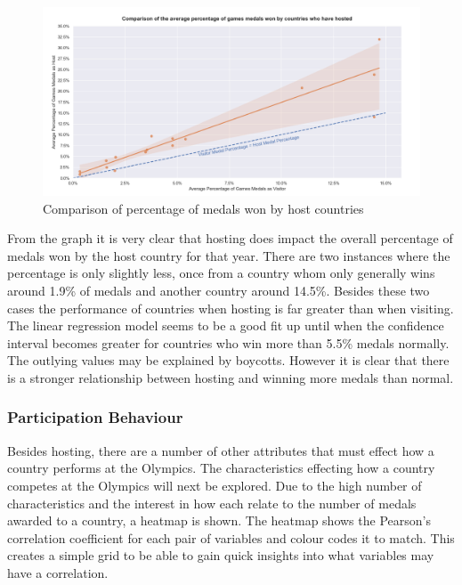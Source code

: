 \documentclass[a4 paper, 12pt]{article}
\begin{document}
        \begin{figure} [H]
            \centering
            \includegraphics[width=\textwidth, frame]
                {./images/graph/countries_host_lmplot.png}      
                \caption{Comparison of percentage of medals won by host countries} 
        \end{figure}
        From the graph it is very clear that hosting does impact the overall percentage of medals won by the host country for that year. There are two instances where the percentage is only slightly less, once from a country whom only generally wins around 1.9\% of medals and another country around 14.5\%. Besides these two cases the performance of countries when hosting is far greater than when visiting. The linear regression model seems to be a good fit up until when the confidence interval becomes greater for countries who win more than 5.5\% medals normally. The outlying values may be explained by boycotts. However it is clear that there is a stronger relationship between hosting and winning more medals than normal. 

        \subsubsection{Participation Behaviour}
        Besides hosting, there are a number of other attributes that must effect how a country performs at the Olympics. The characteristics effecting how a country competes at the Olympics will next be explored. Due to the high number of characteristics and the interest in how each relate to the number of medals awarded to a country, a heatmap is shown. The heatmap shows the Pearson's correlation coefficient for each pair of variables and colour codes it to match. This creates a simple grid to be able to gain quick insights into what variables may have a correlation.
\end{document}
